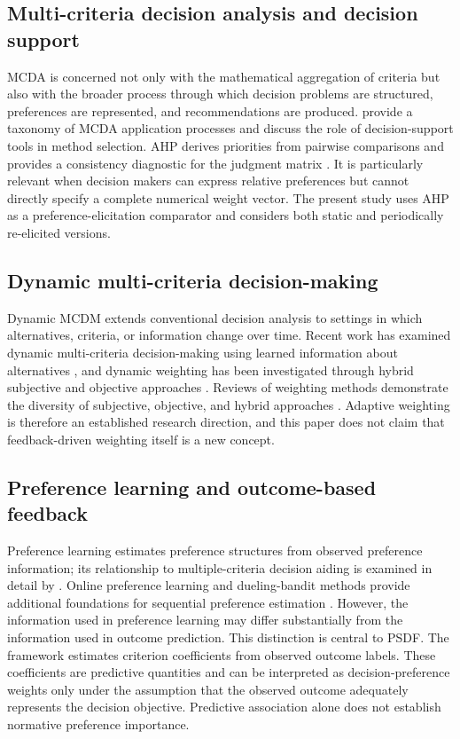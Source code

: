 \documentclass[12pt,a4paper]{article}
\begin{document}
\subsection{Multi-criteria decision analysis and decision support}
MCDA is concerned not only with the mathematical aggregation of criteria but also with the broader process through which decision problems are structured, preferences are represented, and recommendations are produced. \citet{cinelli2020} provide a taxonomy of MCDA application processes and discuss the role of decision-support tools in method selection. AHP derives priorities from pairwise comparisons and provides a consistency diagnostic for the judgment matrix \citep{saaty1980}. It is particularly relevant when decision makers can express relative preferences but cannot directly specify a complete numerical weight vector. The present study uses AHP as a preference-elicitation comparator and considers both static and periodically re-elicited versions.

\subsection{Dynamic multi-criteria decision-making}
Dynamic MCDM extends conventional decision analysis to settings in which alternatives, criteria, or information change over time. Recent work has examined dynamic multi-criteria decision-making using learned information about alternatives \citep{yang2025}, and dynamic weighting has been investigated through hybrid subjective and objective approaches \citep{lu2026}. Reviews of weighting methods demonstrate the diversity of subjective, objective, and hybrid approaches \citep{ayan2023}. Adaptive weighting is therefore an established research direction, and this paper does not claim that feedback-driven weighting itself is a new concept.

\subsection{Preference learning and outcome-based feedback}
Preference learning estimates preference structures from observed preference information; its relationship to multiple-criteria decision aiding is examined in detail by \citet{hullermeier2024a,hullermeier2024b}. Online preference learning and dueling-bandit methods provide additional foundations for sequential preference estimation \citep{bengs2021}. However, the information used in preference learning may differ substantially from the information used in outcome prediction. This distinction is central to PSDF. The framework estimates criterion coefficients from observed outcome labels. These coefficients are predictive quantities and can be interpreted as decision-preference weights only under the assumption that the observed outcome adequately represents the decision objective. Predictive association alone does not establish normative preference importance.
\end{document}
